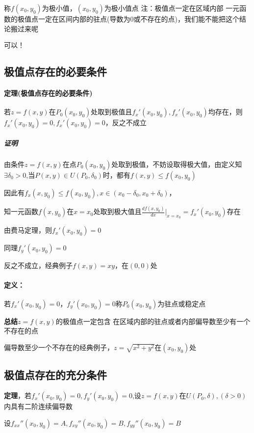 \documentclass{ctexart}
\begin{document}
      称$f(x_0,y_0)$为极小值，$(x_0,y_0)$为极小值点
      注：极值点一定在区域内部
      一元函数的极值点一定在区间内部的驻点(导数为0或不存在的点)，我们能不能把这个结论搬过来呢

      可以！
      
      \subsection{极值点存在的必要条件}
      \paragraph{定理(极值点存在的必要条件)}

        若$z=f(x,y)$在$P_0(x_0,y_0)$处取到极值且$f_x'(x_0,y_0),f_x'(x_0,y_0)$均存在，则$f_x'(x_0,y_0)=0,f_x'(x_0,y_0)=0$，反之不成立

    \subparagraph{证明} 由条件$z=f(x,y)$在点$P_0(x_0,y_0)$处取到极值，不妨设取得极大值，由定义知$\exists \delta_0 >0$,当$P(x,y)\in U(P_0,\delta_0)$时，都有$f(x,y) \le f(x_0,y_0)$

    因此有$f_x(x,y_0) \le f(x_0,y_0),x \in (x_0 - \delta_0,x_0+\delta_0)$，

    知一元函数$f(x,y_0)$在$x=x_0$处取到极大值且$\frac{df(x,y_0)}{dx} \vert_{x=x_0} = f_x'(x_0,y_0)$存在

    由费马定理，则$f_x'(x_0,y_0) = 0 $
    
      同理$f_y'(x_0,y_0) = 0$

      反之不成立，经典例子$f(x,y) = xy$，在$(0,0)$处

      \paragraph{定义：}若$f_x'(x_0,y_0) = 0，f_y'(x_0,y_0)= 0 $称$P_0(x_0,y_0)$为驻点或稳定点

      \textbf{总结}$z = f(x,y)$的极值点一定包含 在区域内部的驻点或者内部偏导数至少有一个不存在的点

      偏导数至少一个不存在的经典例子，$z = \sqrt{x^2+y^2}$在$(x_0,y_0)$处

      \subsection{极值点存在的充分条件}
      \textbf{定理}，若$f_x'(x_0,y_0)= 0,f_y'(x_0,y_0) = 0$,设$z=f(x,y)$在$U(P_0,\delta),(\delta > 0)$内具有二阶连续偏导数

      设$f_{xx}'' (x_0,y_0) = A,f_{xy}'' (x_0,y_0) = B,f_{yy}'' (x_0,y_0) = B$
\end{document}
